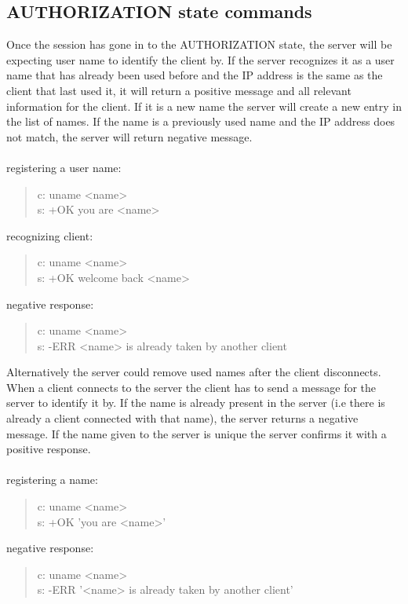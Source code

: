 \documentclass[a4paper,11pt]{article}
\begin{document}
\subsection{AUTHORIZATION state commands}
Once the session has gone in to the AUTHORIZATION state, the server will be expecting user name to identify the client by. If the server recognizes it as a user name that has already been used before and the IP address is the same as the client that last used it, it will return a positive message and all relevant information for the client. If it is a new name the server will create a new entry in the list of names. If the name is a previously used name and the IP address does not match, the server will return negative message.\\\\
registering a user name:
\begin{quote}
  c: uname <name>\\
  s: +OK you are <name>
\end{quote}
\noindent
recognizing client:
\begin{quote}
  c: uname <name>\\
  s: +OK welcome back <name>
\end{quote}
\noindent
negative response:
\begin{quote}
  c: uname <name>\\
  s: -ERR <name> is already taken by another client
\end{quote}


Alternatively the server could remove used names after the client disconnects. When a client connects to the server the client has to send a message for the server to identify it by. If the name is already present in the server (i.e there is already a client connected with that name), the server returns a negative message. If the name given to the server is unique the server confirms it with a positive response.\\\\
registering a name:

\begin{quote}
  c: uname <name>\\
  s: +OK 'you are <name>'
\end{quote}
\noindent
negative response:
\begin{quote}
  c: uname <name>\\
  s: -ERR '<name> is already taken by another client'
\end{quote}


\clearpage
\end{document}
